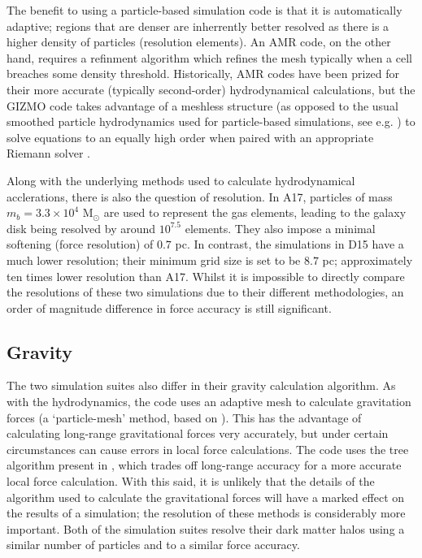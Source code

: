The benefit to using a particle-based simulation code is that it is
automatically adaptive; regions that are denser are inherrently better resolved
as there is a higher density of particles (resolution elements). An AMR code,
on the other hand, requires a refinment algorithm which refines the mesh
typically when a cell breaches some density threshold. Historically, AMR codes
have been prized for their more accurate (typically second-order)
hydrodynamical calculations, but the GIZMO code takes advantage of a
meshless structure (as opposed to the usual smoothed particle hydrodynamics
used for particle-based simulations, see e.g.
\citet{springel_cosmological_2005}) to solve equations to an equally high order
when paired with an appropriate Riemann solver \citep{hopkins_gizmo:_2015,
hopkins_new_2017}.

Along with the underlying methods used to calculate hydrodynamical
acclerations, there is also the question of resolution. In A17, particles of
mass $m_b = 3.3\times10^4$ M$_\odot$ are used to represent the gas elements,
leading to the galaxy disk being resolved by around $10^{7.5}$ elements. They
also impose a minimal softening (force resolution) of $0.7$ pc. In contrast,
the simulations in D15 have a much lower resolution; their minimum grid size
is set to be $8.7$ pc; approximately ten times lower resolution than A17.
Whilst it is impossible to directly compare the resolutions of these two
simulations due to their different methodologies, an order of magnitude
difference in force accuracy is still significant.

\subsection{Gravity}

The two simulation suites also differ in their gravity calculation algorithm.
As with the hydrodynamics, the \hagn{} code uses an adaptive mesh to calculate
gravitation forces (a `particle-mesh' method, based on
\citet{kravtsov_adaptive_1997}). This has the advantage of calculating
long-range gravitational forces very accurately, but under certain
circumstances can cause errors in local force calculations. The \fire{} code
uses the tree algorithm present in \citet{springel_cosmological_2005}, which
trades off long-range accuracy for a more accurate local force calculation.
With this said, it is unlikely that the details of the algorithm used to
calculate the gravitational forces will have a marked effect on the results of
a simulation; the resolution of these methods is considerably more important.
Both of the simulation suites resolve their dark matter halos using a similar
number of particles and to a similar force accuracy.

